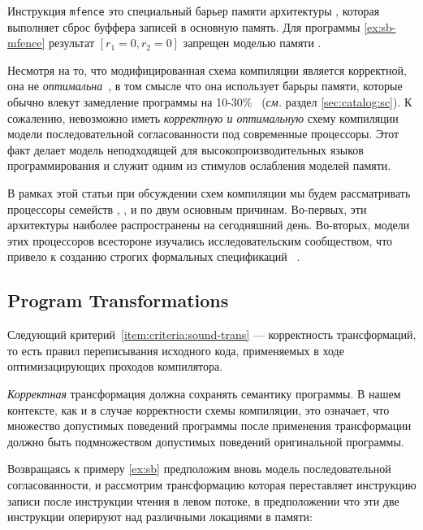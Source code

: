 Инструкция \texttt{mfence} это специальный барьер памяти 
архитектуры \Intel, которая выполняет сброс буффера записей в основную память. 
Для программы \ref{ex:sb-mfence} результат $[r_1=0, r_2=0]$
запрещен моделью памяти \Intel. 

Несмотря на то, что модифицированная схема компиляции является корректной, 
она не \emph{оптимальна}~\cite{OptimalCompilationCPP}, 
в том смысле что она использует барьры памяти,
которые обычно влекут замедление программы 
на 10-30\%~\cite{Marino-al:PLDI11, Liu-al:OOPSLA17}
(\emph{см.} раздел \cref{sec:catalog:sc}).
К сожалению, невозможно иметь \emph{корректную и оптимальную} 
схему компиляции модели последовательной согласованности 
под современные процессоры. 
Этот факт делает модель \SC неподходящей 
для высокопроизводительных языков программирования 
и служит одним из стимулов ослабления моделей памяти. 

В рамках этой статьи при обсуждении 
схем компиляции мы будем рассматривать процессоры семейств
\Intel, ,  и \POWER 
по двум основным причинам. 
Во-первых, эти архитектуры наиболее 
распространены на сегодняшний день. 
Во-вторых, модели этих процессоров 
всестороне изучались исследовательским сообществом, 
что привело к созданию строгих 
формальных спецификаций~%
\cite{Sewell-al:CACM10, Sarkar-al:PLDI11, 
Flur-al:POPL16, Pulte-al:POPL18}. 

\subsection{Program Transformations}
\label{sec:background:trans}

Следующий критерий~\ref{item:criteria:sound-trans} ---
корректность трансформаций, то есть правил переписывания 
исходного кода, применяемых в ходе оптимизацирующих проходов компилятора. 

\emph{Корректная} трансформация должна сохранять семантику программы. 
В нашем контексте, как и в случае корректности схемы компиляции,
это означает, что множество допустимых поведений 
программы после применения трансформации должно 
быть подмножеством допустимых поведений оригинальной программы.

Возвращаясь к примеру \ref{ex:sb}
предположим вновь модель последовательной согласованности, 
и рассмотрим трансформацию которая переставляет
инструкцию записи после инструкции чтения в левом потоке, 
в предположении что эти две инструкции 
оперируют над различными локациями в памяти:

